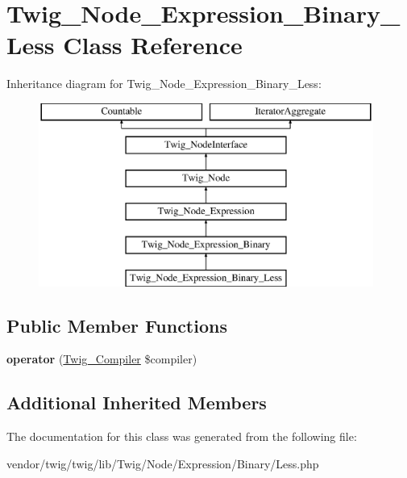 \hypertarget{classTwig__Node__Expression__Binary__Less}{}\section{Twig\+\_\+\+Node\+\_\+\+Expression\+\_\+\+Binary\+\_\+\+Less Class Reference}
\label{classTwig__Node__Expression__Binary__Less}
Inheritance diagram for Twig\+\_\+\+Node\+\_\+\+Expression\+\_\+\+Binary\+\_\+\+Less\+:\begin{figure}[H]
\begin{center}
\leavevmode
\includegraphics[height=6.000000cm]{classTwig__Node__Expression__Binary__Less}
\end{center}
\end{figure}
\subsection*{Public Member Functions}
\begin{DoxyCompactItemize}
\item 
{\bfseries operator} (\hyperlink{classTwig__Compiler}{Twig\+\_\+\+Compiler} \$compiler)\hypertarget{classTwig__Node__Expression__Binary__Less_a7e6434a067616c325fd3210e8b96e2e4}{}\label{classTwig__Node__Expression__Binary__Less_a7e6434a067616c325fd3210e8b96e2e4}

\end{DoxyCompactItemize}
\subsection*{Additional Inherited Members}


The documentation for this class was generated from the following file\+:\begin{DoxyCompactItemize}
\item 
vendor/twig/twig/lib/\+Twig/\+Node/\+Expression/\+Binary/Less.\+php\end{DoxyCompactItemize}
